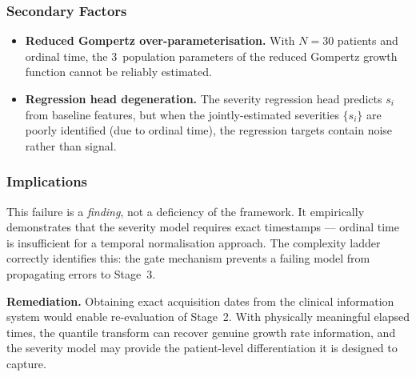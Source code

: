 \subsubsection{Secondary Factors}

\begin{itemize}[leftmargin=*]
  \item \textbf{Reduced Gompertz over-parameterisation.} With $N=30$ patients
    and ordinal time, the 3~population parameters of the reduced Gompertz
    growth function cannot be reliably estimated.
  \item \textbf{Regression head degeneration.} The severity regression head
    predicts $s_i$ from baseline features, but when the jointly-estimated
    severities $\{s_i\}$ are poorly identified (due to ordinal time), the
    regression targets contain noise rather than signal.
\end{itemize}

\subsubsection{Implications}

This failure is a \emph{finding}, not a deficiency of the framework. It
empirically demonstrates that the severity model requires exact timestamps ---
ordinal time is insufficient for a temporal normalisation approach. The
complexity ladder correctly identifies this: the gate mechanism prevents a
failing model from propagating errors to Stage~3.

\textbf{Remediation.} Obtaining exact acquisition dates from the clinical
information system would enable re-evaluation of Stage~2. With physically
meaningful elapsed times, the quantile transform can recover genuine growth
rate information, and the severity model may provide the patient-level
differentiation it is designed to capture.
